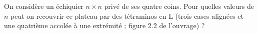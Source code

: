 On considère un échiquier $n \times n$ privé de ses quatre coins. Pour quelles valeurs de $n$ peut-on recouvrir ce plateau par des tétraminos en L (trois cases alignées et une quatrième accolée à une extrémité ; figure 2.2 de l'ouvrage) ?
